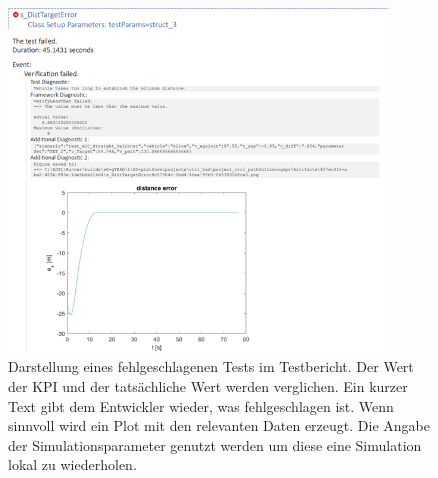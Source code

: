 \begin{figure}
    \centering
    \includegraphics[width=0.9\textwidth]{figures/3_Implementierung/failed_test.png}
    \caption{Darstellung eines fehlgeschlagenen Tests im Testbericht. Der Wert der KPI und der tatsächliche Wert werden verglichen. Ein kurzer Text gibt dem Entwickler wieder, was fehlgeschlagen ist. Wenn sinnvoll wird ein Plot mit den relevanten Daten erzeugt. Die Angabe der Simulationsparameter genutzt werden um diese eine Simulation lokal zu wiederholen.}
    \label{fig:failed_test}
\end{figure}
















